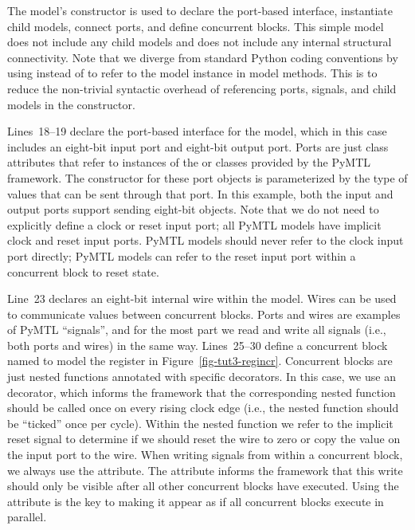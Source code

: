 \documentclass{cbxdoc}
\begin{document}


The model's constructor is used to declare the port-based interface,
instantiate child models, connect ports, and define concurrent blocks.
This simple model does not include any child models and does not include
any internal structural connectivity. Note that we diverge from standard
Python coding conventions by using  instead of  to refer
to the model instance in model methods. This is to reduce the non-trivial
syntactic overhead of referencing ports, signals, and child models in the
constructor.

Lines~18--19 declare the port-based interface for the  model,
which in this case includes an eight-bit input port and eight-bit output
port. Ports are just class attributes that refer to instances of the
 or  classes provided by the PyMTL framework. The
constructor for these port objects is parameterized by the type of values
that can be sent through that port. In this example, both the input and
output ports support sending eight-bit  objects. Note that we do
not need to explicitly define a clock or reset input port; all PyMTL
models have implicit clock and reset input ports. PyMTL models should
never refer to the clock input port directly; PyMTL models can refer to
the reset input port within a concurrent block to reset state.

Line~23 declares an eight-bit internal wire within the model. Wires can
be used to communicate values between concurrent blocks. Ports and wires
are examples of PyMTL ``signals'', and for the most part we read and
write all signals (i.e., both ports and wires) in the same way.
Lines~25--30 define a concurrent block named  to model the
register in Figure~\ref{fig-tut3-regincr}. Concurrent blocks are just
nested functions annotated with specific decorators. In this case, we use
an  decorator, which informs the framework that the
corresponding nested function should be called once on every rising clock
edge (i.e., the nested function should be ``ticked'' once per cycle).
Within the nested function we refer to the implicit reset signal to
determine if we should reset the  wire to zero or copy the
value on the input port to the  wire. When writing signals
from within a  concurrent block, we always use the
 attribute. The  attribute informs the framework that
this write should only be visible after all other  concurrent
blocks have executed. Using the  attribute is the key to making
it appear as if all  concurrent blocks execute in parallel.
\end{document}
